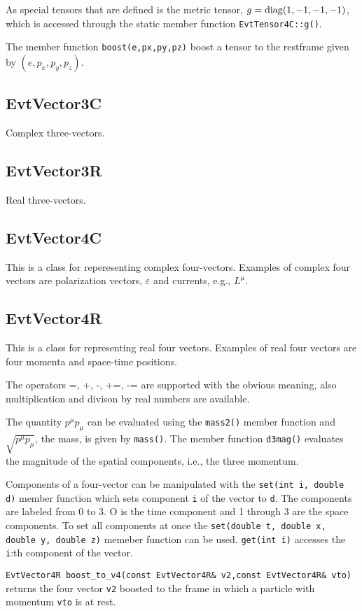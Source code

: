 As special tensors that are defined is the metric tensor, 
$g={\rm diag}(1,-1,-1,-1)$, which is accessed through the static
member function {\tt EvtTensor4C::g()}.

The member function {\tt boost(e,px,py,pz)} boost a tensor to the restframe
given by $(e,p_x,p_y,p_z)$.



\subsection{EvtVector3C}

Complex three-vectors.

\subsection{EvtVector3R}

Real three-vectors.


\subsection{EvtVector4C}

This is a class for reperesenting complex four-vectors. Examples 
of complex four vectors are polarization vectors, $\varepsilon$
and currents, e.g., $L^{\mu}$.

\subsection{EvtVector4R}

This is a class for representing real four vectors. Examples 
of real four vectors are four momenta and space-time positions.

The operators =, +, -, +=, -= are supported with the obvious meaning,
also multiplication and divison by real numbers are available. 

The quantity $p^{\mu}p_{\mu}$ can be evaluated using the {\tt mass2()}
member function and $\sqrt{p^{\mu}p_{\mu}}$, the mass, is given
by {\tt mass()}. The member function {\tt d3mag()} evaluates the
magnitude of the spatial components, i.e., the three momentum.

Components of a four-vector can be manipulated with the 
{\tt set(int i, double d)} member function which sets component
{\tt i} of the vector to {\tt d}. The components are labeled
from 0 to 3. O is the time component and 1 through 3 are
the space components. To set all components at once the 
{\tt set(double t, double x, double y, double z)} memeber function
can be used. {\tt get(int i)} accesses the {\tt i}:th component of
the vector.

{\tt EvtVector4R boost\_to\_v4(const EvtVector4R\& v2,const EvtVector4R\& vto)}
returns the four vector {\tt v2} boosted to the frame in which a particle
with momentum {\tt vto} is at rest.





